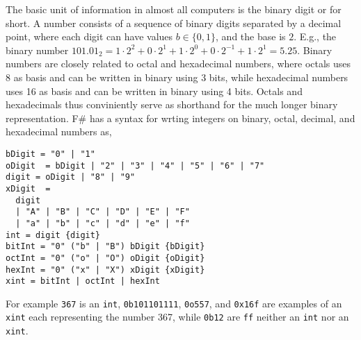 The basic unit of information in almost all computers is the binary digit or  for short. A  number consists of a sequence of binary digits separated by a decimal point, where each digit can have values $b \in \{0,1\}$, and the base is $2$. E.g., the binary number $101.01_2 = 1\cdot 2^2+0\cdot 2^1+1\cdot 2^0+0\cdot 2^{-1}+1\cdot 2^1=5.25$. Binary numbers are closely related to octal and hexadecimal numbers, where octals uses 8 as basis and can be written in binary using 3 bits, while hexadecimal numbers uses 16 as basis and can be written in binary using 4 bits. Octals and hexadecimals thus conviniently serve as shorthand for the much longer binary representation. F\# has a syntax for wrting integers on binary, octal, decimal, and hexadecimal numbers as,
%
\begin{lstlisting}[language=EBNF]
bDigit = "0" | "1"
oDigit  = bDigit | "2" | "3" | "4" | "5" | "6" | "7"
digit = oDigit | "8" | "9"
xDigit  = 
  digit 
  | "A" | "B" | "C" | "D" | "E" | "F" 
  | "a" | "b" | "c" | "d" | "e" | "f" 
int = digit {digit}
bitInt = "0" ("b" | "B") bDigit {bDigit}
octInt = "0" ("o" | "O") oDigit {oDigit}
hexInt = "0" ("x" | "X") xDigit {xDigit}
xint = bitInt | octInt | hexInt
\end{lstlisting}
%
For example \lstinline!367! is an \lstinline[language=EBNF]!int!, \lstinline!0b101101111!, \lstinline!0o557!, and \lstinline!0x16f! are examples of an \lstinline[language=EBNF]!xint! each representing the number 367, while \lstinline!0b12! are \lstinline!ff! neither an \lstinline[language=EBNF]!int! nor an \lstinline[language=EBNF]!xint!.

